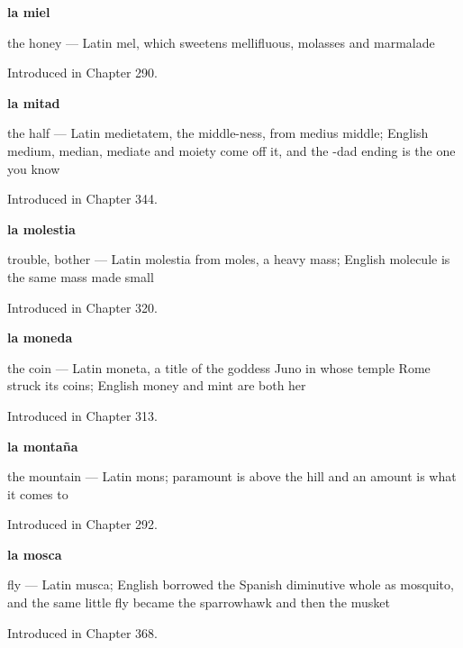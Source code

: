 \noindent\begin{minipage}[t]{\linewidth}
\raggedright
\textbf{la miel}\par
\small the honey — Latin mel, which sweetens mellifluous, molasses and marmalade\par
\footnotesize Introduced in Chapter 290.
\end{minipage}\par\medskip

\noindent\begin{minipage}[t]{\linewidth}
\raggedright
\textbf{la mitad}\par
\small the half — Latin medietatem, the middle-ness, from medius middle; English medium, median, mediate and moiety come off it, and the -dad ending is the one you know\par
\footnotesize Introduced in Chapter 344.
\end{minipage}\par\medskip

\noindent\begin{minipage}[t]{\linewidth}
\raggedright
\textbf{la molestia}\par
\small trouble, bother — Latin molestia from moles, a heavy mass; English molecule is the same mass made small\par
\footnotesize Introduced in Chapter 320.
\end{minipage}\par\medskip

\noindent\begin{minipage}[t]{\linewidth}
\raggedright
\textbf{la moneda}\par
\small the coin — Latin moneta, a title of the goddess Juno in whose temple Rome struck its coins; English money and mint are both her\par
\footnotesize Introduced in Chapter 313.
\end{minipage}\par\medskip

\noindent\begin{minipage}[t]{\linewidth}
\raggedright
\textbf{la montaña}\par
\small the mountain — Latin mons; paramount is above the hill and an amount is what it comes to\par
\footnotesize Introduced in Chapter 292.
\end{minipage}\par\medskip

\noindent\begin{minipage}[t]{\linewidth}
\raggedright
\textbf{la mosca}\par
\small fly — Latin musca; English borrowed the Spanish diminutive whole as mosquito, and the same little fly became the sparrowhawk and then the musket\par
\footnotesize Introduced in Chapter 368.
\end{minipage}\par\medskip

